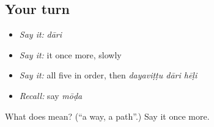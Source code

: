 \subsection*{Your turn}
\begin{itemize}
\raggedright
  \item \emph{Say it:} \emph{dāri}
  \item \emph{Say it:} it once more, slowly
  \item \emph{Say it:} all five in order, then \emph{dayaviṭṭu dāri hēḷi}
  \item \emph{Recall:} say \emph{mōḍa}
\end{itemize}

\begin{tcolorbox}[breakable,colback=teal!4,colframe=teal!35!black,title={Before you move on}]
What does  mean? (\textquotedblleft{}a way, a path\textquotedblright{}.) Say it once more.
\end{tcolorbox}
